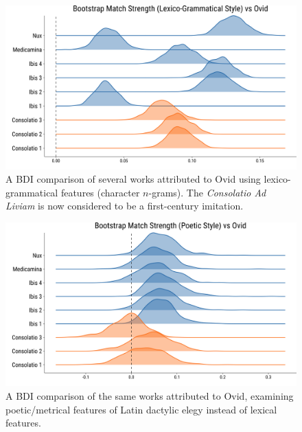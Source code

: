 \documentclass[
    hf
]{ceurart}
\begin{document}
\begin{figure}
    \includegraphics[width=\linewidth]{images/bootstrap_lexical_paper.png}
    \caption{A BDI comparison of several works attributed to Ovid using
        lexico-grammatical features (character $n$-grams). The \emph{Consolatio Ad
            Liviam} is now considered to be a first-century imitation.}
    \label{fig:nux_lex}
\end{figure}

\begin{figure}
    \includegraphics[width=\linewidth]{images/bootstrap_poetics_paper.png}
    \caption{A BDI comparison of the same works attributed to Ovid, examining
        poetic/metrical features of Latin dactylic elegy instead of lexical
        features.}
    \label{fig:nux_poet}
\end{figure}
\end{document}

